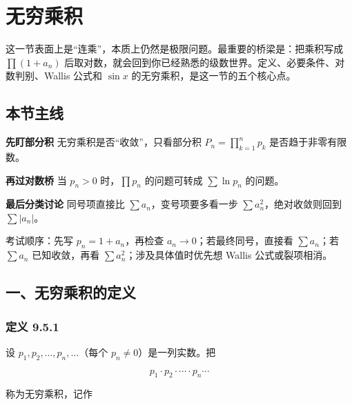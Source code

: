 \section{无穷乘积}

这一节表面上是“连乘”，本质上仍然是极限问题。最重要的桥梁是：把乘积写成 \(\prod(1+a_n)\) 后取对数，就会回到你已经熟悉的级数世界。定义、必要条件、对数判别、Wallis 公式和 \(\sin x\) 的无穷乘积，是这一节的五个核心点。

\subsection*{本节主线}

\begin{conceptbox}
\textbf{先盯部分积}
无穷乘积是否“收敛”，只看部分积 \(P_n=\prod_{k=1}^n p_k\) 是否趋于非零有限数。
\end{conceptbox}

\begin{conceptbox}
\textbf{再过对数桥}
当 \(p_n>0\) 时，\(\prod p_n\) 的问题可转成 \(\sum \ln p_n\) 的问题。
\end{conceptbox}

\begin{conceptbox}
\textbf{最后分类讨论}
同号项直接比 \(\sum a_n\)，变号项要多看一步 \(\sum a_n^2\)，绝对收敛则回到 \(\sum |a_n|\)。
\end{conceptbox}

\begin{notebox}
考试顺序：先写 \(p_n=1+a_n\)，再检查 \(a_n\to0\)；若最终同号，直接看 \(\sum a_n\)；若 \(\sum a_n\) 已知收敛，再看 \(\sum a_n^2\)；涉及具体值时优先想 Wallis 公式或裂项相消。
\end{notebox}

\subsection*{一、无穷乘积的定义}

\subsubsection*{定义 9.5.1}

设 \(p_1,p_2,\ldots,p_n,\ldots\)（每个 \(p_n\neq0\)）是一列实数。把

\[
      p_1\cdot p_2\cdot \cdots \cdot p_n\cdots
    \]

称为无穷乘积，记作

